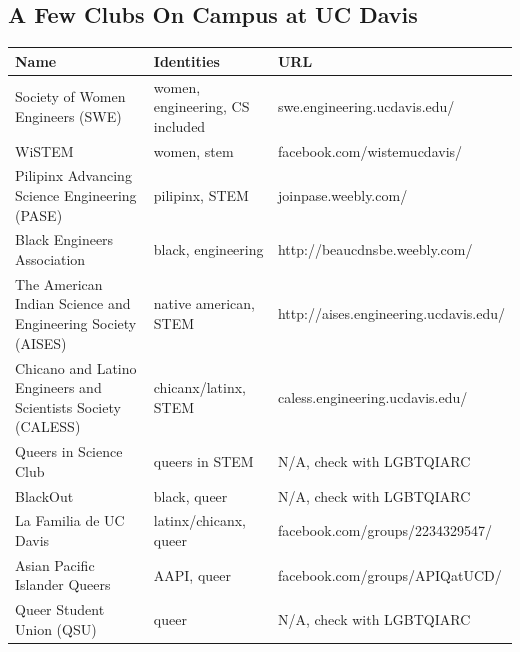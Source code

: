\documentclass{article}
\begin{document}
\subsection{A Few Clubs On Campus at UC Davis}
\begin{tabular}{p{5cm}lp{7cm}}
  \toprule
\textbf{Name} & \textbf{Identities} & \textbf{URL} \\
  \midrule
Society of Women Engineers (SWE) & women, engineering, CS included & swe.engineering.ucdavis.edu/ \\
\addlinespace[0.5em]
WiSTEM & women, stem & facebook.com/wistemucdavis/ \\
\addlinespace[0.5em]
Pilipinx Advancing Science Engineering (PASE) & pilipinx, STEM & joinpase.weebly.com/ \\
\addlinespace[0.5em]
Black Engineers Association & black, engineering & http://beaucdnsbe.weebly.com/ \\
\addlinespace[0.5em]
The American Indian Science and Engineering Society (AISES) & native american, STEM & http://aises.engineering.ucdavis.edu/ \\
\addlinespace[0.5em]
Chicano and Latino Engineers and Scientists Society (CALESS) & chicanx/latinx, STEM & caless.engineering.ucdavis.edu/ \\
\addlinespace[0.5em]
Queers in Science Club & queers in STEM & N/A, check with LGBTQIARC\\
\addlinespace[0.5em]
BlackOut & black, queer & N/A, check with LGBTQIARC \\
\addlinespace[0.5em]
La Familia de UC Davis & latinx/chicanx, queer & facebook.com/groups/2234329547/ \\
\addlinespace[0.5em]
Asian Pacific Islander Queers & AAPI, queer & facebook.com/groups/APIQatUCD/ \\
\addlinespace[0.5em]
Queer Student Union (QSU) & queer & N/A, check with LGBTQIARC \\
  \bottomrule
\end{tabular}
\end{document}
